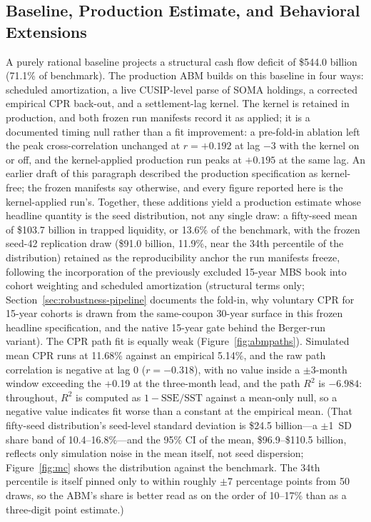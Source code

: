 \documentclass[12pt]{article}
\begin{document}
\subsection{Baseline, Production Estimate, and Behavioral Extensions}\label{sec:abm-results}

A purely rational baseline projects a structural cash flow deficit of \$544.0 billion (71.1\% of benchmark). The production ABM builds on this baseline in four ways: scheduled amortization, a live CUSIP-level parse of SOMA holdings, a corrected empirical CPR back-out, and a settlement-lag kernel. The kernel is retained in production, and both frozen run manifests record it as applied; it is a documented timing null rather than a fit improvement: a pre-fold-in ablation left the peak cross-correlation unchanged at $r = +0.192$ at lag $-3$ with the kernel on or off, and the kernel-applied production run peaks at $+0.195$ at the same lag. An earlier draft of this paragraph described the production specification as kernel-free; the frozen manifests say otherwise, and every figure reported here is the kernel-applied run's. Together, these additions yield a production estimate whose headline quantity is the seed distribution, not any single draw: a fifty-seed mean of \$103.7 billion in trapped liquidity, or 13.6\% of the benchmark, with the frozen seed-42 replication draw (\$91.0 billion, 11.9\%, near the 34th percentile of the distribution) retained as the reproducibility anchor the run manifests freeze, following the incorporation of the previously excluded 15-year MBS book into cohort weighting and scheduled amortization (structural terms only; Section~\ref{sec:robustness-pipeline} documents the fold-in, why voluntary CPR for 15-year cohorts is drawn from the same-coupon 30-year surface in this frozen headline specification, and the native 15-year gate behind the Berger-run variant). The CPR path fit is equally weak (Figure~\ref{fig:abmpaths}). Simulated mean CPR runs at 11.68\% against an empirical 5.14\%, and the raw path correlation is negative at lag 0 ($r = -0.318$), with no value inside a $\pm$3-month window exceeding the +0.19 at the three-month lead, and the path $R^2$ is $-6.984$: throughout, $R^2$ is computed as $1-\mathrm{SSE}/\mathrm{SST}$ against a mean-only null, so a negative value indicates fit worse than a constant at the empirical mean. (That fifty-seed distribution's seed-level standard deviation is \$24.5 billion---a $\pm$1~SD share band of 10.4--16.8\%---and the 95\% CI of the mean, \$96.9--\$110.5 billion, reflects only simulation noise in the mean itself, not seed dispersion; Figure~\ref{fig:mc} shows the distribution against the benchmark. The 34th percentile is itself pinned only to within roughly $\pm$7 percentage points from 50 draws, so the ABM's share is better read as on the order of 10--17\% than as a three-digit point estimate.)
\end{document}
